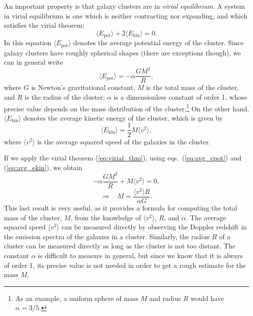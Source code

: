 An important property is that galaxy clusters are in {\it virial equilibrium}. A system in virial equilibrium is one which is neither contracting nor expanding, and which satisfies the virial theorem:
\begin{equation} \label{eq:virial_thm}
\langle E_{\mathrm{pot}}\rangle +2\langle E_{\mathrm{kin}}\rangle =0.
\end{equation}
In this equation $\langle E_{\mathrm{pot}}\rangle$ denotes the average potential energy of the cluster. Since galaxy clusters have roughly spherical shapes (there are exceptions though), we can in general write
\begin{equation} \label{eq:avg_epot}
\langle E_{\mathrm{pot}}\rangle = -\alpha \frac{GM^2}{R},
\end{equation}
where $G$ is Newton's gravitational constant, $M$ is the total mass of the cluster, and $R$ is the radius of the cluster; $\alpha$ is a dimensionless constant of order 1, whose precise value depends on the mass distribution of the cluster.\footnote{As an example, a uniform sphere of mass $M$ and radius $R$ would have $\alpha=3/5$.} On the other hand, $\langle E_{\mathrm{kin}}\rangle$ denotes the average kinetic energy of the cluster, which is given by
\begin{equation} \label{eq:avg_ekin}
\langle E_{\mathrm{kin}}\rangle = \frac{1}{2}M\langle v^2\rangle,
\end{equation}
where $\langle v^2\rangle$ is the average squared speed of the galaxies in the cluster.

If we apply the virial theorem (\ref{eq:virial_thm}), using eqs.\ (\ref{eq:avg_epot}) and (\ref{eq:avg_ekin}), we obtain
\begin{equation}
-\alpha \frac{GM^2}{R}+M\langle v^2\rangle=0,
\end{equation}
\begin{equation}
\Rightarrow~~~~ M=\frac{\langle v^2\rangle R}{\alpha G}.
\end{equation}
This last result is very useful, as it provides a formula for computing the total mass of the cluster, $M$, from the knowledge of $\langle v^2\rangle$, $R$, and $\alpha$. The average squared speed $\langle v^2\rangle$ can be measured directly by observing the Doppler redshift in the emission spectra of the galaxies in a cluster. Similarly, the radius $R$ of a cluster can be measured directly as long as the cluster is not too distant. The constant $\alpha$ is difficult to measure in general, but since we know that it is always of order 1, its precise value is not needed in order to get a rough estimate for the mass $M$.

